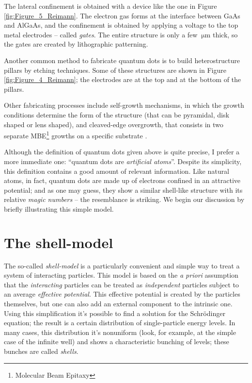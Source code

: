 The lateral confinement is obtained with a device like the one in Figure \ref{fig:Figure_5_Reimann}. The electron gas forms at the interface between GaAs and AlGaAs, and the confinement is obtained by applying a voltage to the top metal electrodes -- called \emph{gates}. The entire structure is only a few $\SI{}{\micro\meter}$ thick, so the gates are created by lithographic patterning.

Another common method to fabricate quantum dots is to build heterostructure pillars by etching techniques. Some of these structures are shown in Figure \ref{fig:Figure_4_Reimann}; the electrodes are at the top and at the bottom of the pillars.

Other fabricating processes include self-growth mechanisms, in which the growth conditions determine the form of the structure (that can be pyramidal, disk shaped or lens shaped), and cleaved-edge overgrowth, that consists in two separate MBE\footnote{Molecular Beam Epitaxy} growths on a specific substrate \citep[see][]{Reimann2002}.

Although the definition of quantum dots given above is quite precise, I prefer a more immediate one: ``quantum dots are \emph{artificial atoms}''. Despite its simplicity, this definition contains a good amount of relevant information. Like natural atoms, in fact, quantum dots are made up of electrons confined in an attractive potential; and as one may guess, they show a similar shell-like structure with its relative \emph{magic numbers} -- the resemblance is striking. We begin our discussion by briefly illustrating this simple model.

\section{The shell-model}
\label{sec:shell_model}
The so-called \emph{shell-model} is a particularly convenient and simple way to treat a system of interacting particles. This model is based on the \emph{a priori} assumption that the \emph{interacting} particles can be treated as \emph{independent} particles subject to an average \emph{effective potential}. This effective potential is created by the particles themselves, but one can also add an external component to the intrinsic one. Using this simplification it's possible to find a solution for the Schr\"{o}dinger equation; the result is a certain distribution of single-particle energy levels. In many cases, this distribution it's nonuniform (look, for example, at the simple case of the infinite well) and shows a characteristic bunching of levels; these bunches are called \emph{shells}.

